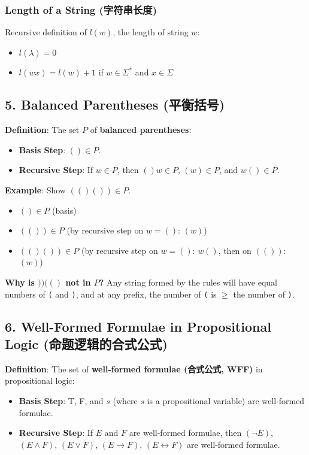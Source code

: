 \documentclass[10pt,a4paper,openany]{ctexbook}
\theoremstyle{definition}
\theoremstyle{remark}
\begin{document}
\subsubsection{Length of a String (字符串长度)}

Recursive definition of $l(w)$, the length of string $w$:
\begin{itemize}
\item $l(\lambda) = 0$
\item $l(wx) = l(w) + 1$ if $w \in \Sigma^*$ and $x \in \Sigma$

\end{itemize}

\vspace{-2pt}

\subsection{5. Balanced Parentheses (平衡括号)}

\textbf{Definition}: The set $P$ of \textbf{balanced parentheses}:
\begin{itemize}
\item \textbf{Basis Step}: $() \in P$.
\item \textbf{Recursive Step}: If $w \in P$, then $()w \in P$, $(w) \in P$, and $w() \in P$.

\end{itemize}

\textbf{Example}: Show $(()()) \in P$.
\begin{itemize}
\item $() \in P$ (basis)
\item $(()) \in P$ (by recursive step on $w = ()$: $(w)$)
\item $(()()) \in P$ (by recursive step on $w = ()$: $w()$, then on $(())$: $(w)$)

\end{itemize}

\textbf{Why is $))(()$ not in $P$?} Any string formed by the rules will have equal numbers of \texttt{(} and \texttt{)}, and at any prefix, the number of \texttt{(} is $\ge$ the number of \texttt{)}.
\vspace{-2pt}

\subsection{6. Well-Formed Formulae in Propositional Logic (命题逻辑的合式公式)}

\textbf{Definition}: The set of \textbf{well-formed formulae (合式公式, WFF)} in propositional logic:
\begin{itemize}
\item \textbf{Basis Step}: T, F, and $s$ (where $s$ is a propositional variable) are well-formed formulae.
\item \textbf{Recursive Step}: If $E$ and $F$ are well-formed formulae, then $(\lnot E)$, $(E \land F)$, $(E \lor F)$, $(E \to F)$, $(E \leftrightarrow F)$ are well-formed formulae.

\end{itemize}
\end{document}
